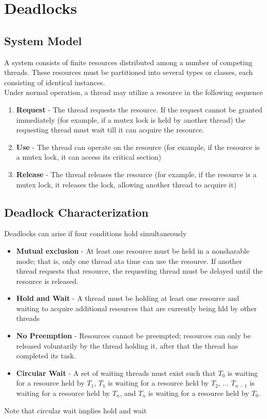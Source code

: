 \documentclass[oneside]{book}
\begin{document}
    \chapter{Deadlocks}
        \section{System Model}
            A system consists of finite resources distributed among a number of competing threads.
            These resources must be partitioned into several types or classes, each consisting of identical
            instances.\\
            Under normal operation, a thread may utilize a resource in the following sequence
            \begin{enumerate}
                \item \textbf{Request} - The thread requests the resource. If the request cannot be granted 
                immediately (for example, if a mutex lock is held by another thread) the requesting thread must
                wait till it can acquire the resource.
                \item \textbf{Use} - The thread can operate on the resource (for example, if the resource is a mutex
                lock, it can access its critical section)
                \item \textbf{Release} - The thread releases the resource (for example, if the resource is a mutex
                lock, it releases the lock, allowing another thread to acquire it)
            \end{enumerate}
        \section{Deadlock Characterization}
            Deadlocks can arise if four conditions hold simultaneously
            \begin{itemize}
                \item \textbf{Mutual exclusion} - At least one resource must be held in a nonsharable mode;
                that is, only one thread ata time can use the resource. If another thread requests that resource, 
                the requesting thread must be delayed until the resource is released.
                \item \textbf{Hold and Wait} - A thread must be holding at least one resource and waiting to acquire
                additional resources that are currently being hld by other threads
                \item \textbf{No Preemption} - Resources cannot be preempted; resources can only be released voluntarily
                by the thread holding it, after that the thread has completed its task.
                \item \textbf{Circular Wait} - A set of waiting threads must exist such that $T_0$ is waiting for a 
                resource held by $T_1$, $T_1$ is waiting for a resource held by $T_2$, ... $T_{n-1}$ is waiting for a 
                resource held by $T_n$, and $T_n$ is waiting for a resource held by $T_0$.
            \end{itemize}
            Note that circular wait implies hold and wait
\end{document}
